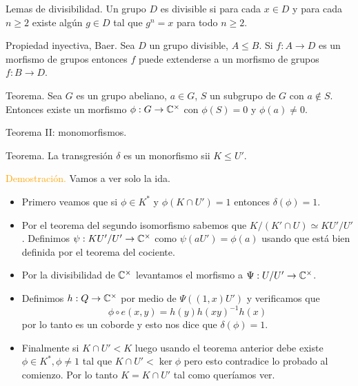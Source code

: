 \documentclass[aspectratio=169, 9pt]{beamer}
\begin{document}
\begin{frame}{Lemas de divisibilidad.}
	Un grupo $D$ es \alert{divisible} si para cada $x \in D$ y para cada $n \ge 2$ existe algún $g \in D$ tal que $g^n = x$ para todo $n \ge 2$. \pause
	\begin{alertblock}{Propiedad inyectiva, Baer.}
		Sea $D$ un grupo divisible, $A \le B$. Si $f:A \to D$ es un morfismo de grupos entonces $f$ puede extenderse a un morfismo de grupos $f:B \to D$.
	\end{alertblock}
	\begin{alertblock}{Teorema.}
	Sea $G$ es un grupo abeliano, $a \in G$, $S$ un subgrupo de $G$ con $a \notin S$. Entonces existe un morfismo $\phi:G \to \Bbb C^\times$ con $\phi(S)=0$ y $\phi(a) \neq 0$.
	\end{alertblock}
\end{frame}


\begin{frame}[fragile]{Teorema II: monomorfismos.}
\begin{alertblock}{Teorema.}
La transgresión $\delta$ es un monorfismo sii $K \le U'$.
\end{alertblock}
\textcolor{orange}{Demostración.} Vamos a ver solo la ida.
\begin{itemize}
	\item Primero veamos que si $\phi \in K^*$ y $\phi(K \cap U')=1$ entonces $\delta(\phi)=1$.
	\pause
	\item Por el teorema del segundo isomorfismo sabemos que $K/(K'\cap U) \simeq KU'/U'$. Definimos $\psi:KU'/U' \to \Bbb C^\times$ como $\psi(aU')=\phi(a)$ usando que está bien definida por el teorema del cociente.
	\pause
	\item Por la divisibilidad de $\Bbb C^\times$ levantamos el morfismo a $\Psi: U/U' \to \Bbb C^\times$.
	\pause
	\item Definimos $h:Q \to \Bbb C^\times$ por medio de $\Psi((1,x)U')$ y verificamos que \begin{equation*}
		\phi \circ e(x,y) = h(y)h(xy)^{-1}h(x)
	\end{equation*}
	por lo tanto es un coborde y esto nos dice que $\delta(\phi) = 1$.
	\item Finalmente si $K \cap U' < K$ luego usando el teorema anterior debe existe $\phi \in K^*, \phi \neq 1$ tal que $K\cap U' < \ker \phi$ pero esto contradice lo probado al comienzo. Por lo tanto $K = K \cap U'$ tal como queríamos ver.
\end{itemize}
\end{frame}
\end{document}

